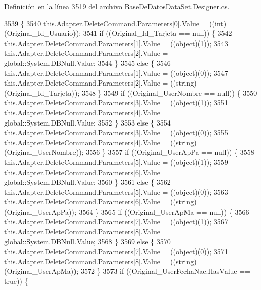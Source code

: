 Definición en la línea 3519 del archivo Base\-De\-Datos\-Data\-Set.\-Designer.\-cs.


\begin{DoxyCode}
3539                                                                        \{
3540             this.Adapter.DeleteCommand.Parameters[0].Value = ((int)(Original\_Id\_Usuario));
3541             \textcolor{keywordflow}{if} ((Original\_Id\_Tarjeta == null)) \{
3542                 this.Adapter.DeleteCommand.Parameters[1].Value = ((object)(1));
3543                 this.Adapter.DeleteCommand.Parameters[2].Value = global::System.DBNull.Value;
3544             \}
3545             \textcolor{keywordflow}{else} \{
3546                 this.Adapter.DeleteCommand.Parameters[1].Value = ((object)(0));
3547                 this.Adapter.DeleteCommand.Parameters[2].Value = ((string)(Original\_Id\_Tarjeta));
3548             \}
3549             \textcolor{keywordflow}{if} ((Original\_UserNombre == null)) \{
3550                 this.Adapter.DeleteCommand.Parameters[3].Value = ((object)(1));
3551                 this.Adapter.DeleteCommand.Parameters[4].Value = global::System.DBNull.Value;
3552             \}
3553             \textcolor{keywordflow}{else} \{
3554                 this.Adapter.DeleteCommand.Parameters[3].Value = ((object)(0));
3555                 this.Adapter.DeleteCommand.Parameters[4].Value = ((string)(Original\_UserNombre));
3556             \}
3557             \textcolor{keywordflow}{if} ((Original\_UserApPa == null)) \{
3558                 this.Adapter.DeleteCommand.Parameters[5].Value = ((object)(1));
3559                 this.Adapter.DeleteCommand.Parameters[6].Value = global::System.DBNull.Value;
3560             \}
3561             \textcolor{keywordflow}{else} \{
3562                 this.Adapter.DeleteCommand.Parameters[5].Value = ((object)(0));
3563                 this.Adapter.DeleteCommand.Parameters[6].Value = ((string)(Original\_UserApPa));
3564             \}
3565             \textcolor{keywordflow}{if} ((Original\_UserApMa == null)) \{
3566                 this.Adapter.DeleteCommand.Parameters[7].Value = ((object)(1));
3567                 this.Adapter.DeleteCommand.Parameters[8].Value = global::System.DBNull.Value;
3568             \}
3569             \textcolor{keywordflow}{else} \{
3570                 this.Adapter.DeleteCommand.Parameters[7].Value = ((object)(0));
3571                 this.Adapter.DeleteCommand.Parameters[8].Value = ((string)(Original\_UserApMa));
3572             \}
3573             \textcolor{keywordflow}{if} ((Original\_UserFechaNac.HasValue == \textcolor{keyword}{true})) \{

\end{DoxyCode}
